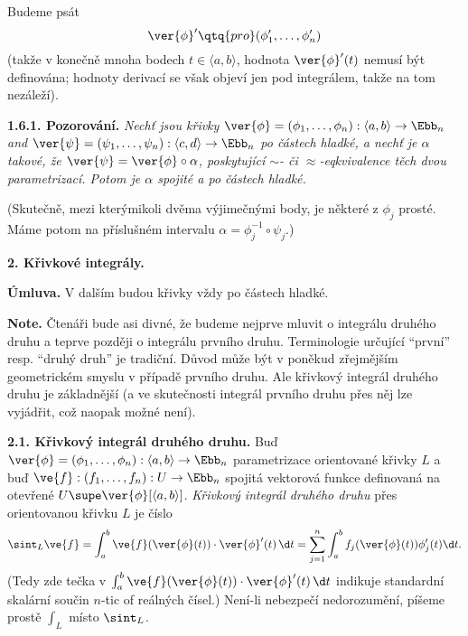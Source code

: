 \documentclass[12pt]{article}
\begin{document}
Budeme psát
$$
\ver{\phi}'\qtq{pro} (\phi'_1,\dots,\phi'_n)
$$
 (takže v konečně mnoha bodech $t\in\langle a,b\rangle$, hodnota $\ver{\phi}'(t)$ nemusí být definována; hodnoty derivací se však objeví jen pod integrálem,  takže na tom nezáleží).

\medskip

{\bf 1.6.1. Pozorování.} {\em Nechť jsou křivky $\ver{\phi}=(\phi_1,\dots,\phi_n):\langle a,b\rangle\to\Ebb_n$ and $\ver{\psi}=(\psi_1,\dots,\psi_n):\langle c,d\rangle\to\Ebb_n$ po částech hladké, a nechť je $\alpha$ takové, že $\ver{\psi}=\ver{\phi}\circ\alpha$, poskytující $\sim$- či $\approx$-eqkvivalence těch dvou parametrizací. Potom je $\alpha$ spojité a po částech hladké.}

\smallskip

(Skutečně, mezi kterýmikoli dvěma výjimečnými body, je některé z $\phi_j$ prosté. Máme potom na příslušném intervalu $\alpha=\phi_j^{-1}\circ\psi_j$.)

 
 
\vskip10mm

 {\large\bf 2. Křivkové integrály.}


\bigskip

{\bf Úmluva.} V dalším budou křivky vždy po částech hladké.

\bigskip

{\bf Note.} Čtenáři bude asi divné, že budeme nejprve mluvit o integrálu druhého druhu a teprve později o integrálu prvního druhu.
Terminologie určující ``první'' resp. ``druhý druh'' je tradiční. Důvod může být v poněkud zřejmějším geometrickém smyslu v případě prvního druhu.
Ale křivkový integrál druhého druhu je základnější (a ve skutečnosti integrál prvního druhu přes něj lze vyjádřit, což naopak možné není).



\bigskip

{\bf 2.1. Křivkový integrál druhého druhu.} Buď $\ver{\phi}=
(\phi_1,\dots,\phi_n):\langle a,b\rangle\to\Ebb_n$ parametrizace orientované křivky $L$ a buď
$\ve{f}:(f_1,\dots,f_n):U\to\Ebb_n$ spojitá vektorová funkce definovaná na otevřené $U\supe
\ver{\phi}[\langle a,b\rangle]$.
 {\em Křivkový integrál druhého druhu} přes orientovanou křivku $L$ je číslo
$$
\sint_L\ve{f}=\int_a^b\ve{f}(\ver{\phi}(t))\cdot\ver{\phi}'(t)\,\d t=
\sum_{j=1}^n\int_a^bf_j(\ver{\phi}(t))\phi_j'(t)\d t.
$$
(Tedy zde tečka v $\int_a^b\ve{f}(\ver{\phi}(t))\cdot\ver{\phi}'(t)\,\d t$
indikuje standardní skalární součin $n$-tic of reálných čísel.) Není-li nebezpečí nedorozumění, píšeme prostě $\int_L$ místo $\sint_L$.
\end{document}
